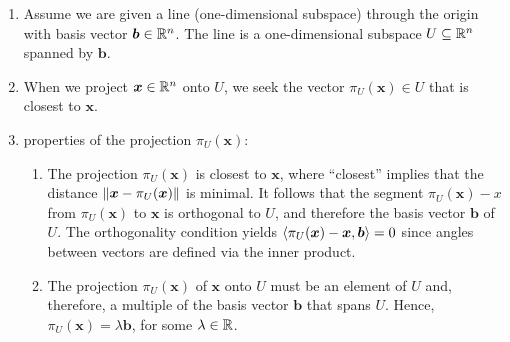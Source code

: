 \begin{enumerate}
    \item Assume we are given a line (one-dimensional subspace) through the origin with basis vector $\bm{b} \in \mathbb{R}^n$.
    The line is a one-dimensional subspace $U \subseteq \mathbb{R}^n$ spanned by $\bm{b}$.
    \hfill \cite{mfml/book/mml/Deisenroth-Faisal-Ong}

    \item When we project $\bm{x} \in \mathbb{R}^n$ onto $U$, we seek the vector $\pi_U (\bm{x}) \in U$ that is closest to $\bm{x}$.
    \hfill \cite{mfml/book/mml/Deisenroth-Faisal-Ong}

    \item properties of the projection $\pi_U (\bm{x})$:
    \begin{enumerate}
        \item The projection $\pi _U (\bm{x})$ is closest to $\bm{x}$, where “closest” implies that the distance $\left\| \bm{x} - \pi _U (\bm{x}) \right\|$ is minimal.
        It follows that the segment $\pi _U (\bm{x}) - x$ from $\pi _U (\bm{x})$ to $\bm{x}$ is orthogonal to $U$, and therefore the basis vector $\bm{b}$ of $U$.
        The orthogonality condition yields $\langle\pi _U (\bm{x})  -  \bm{x}, \bm{b}\rangle = 0$ since angles between vectors are defined via the inner product.
        \hfill \cite{mfml/book/mml/Deisenroth-Faisal-Ong}

        \item The projection $\pi_U (\bm{x})$ of $\bm{x}$ onto $U$ must be an element of $U$ and, therefore, a multiple of the basis vector $\bm{b}$ that spans $U$.
        Hence, $\pi_U (\bm{x}) = \lambda\bm{b}$, for some $\lambda \in \mathbb{R}$.
        \hfill \cite{mfml/book/mml/Deisenroth-Faisal-Ong}
    \end{enumerate}


\end{enumerate}
